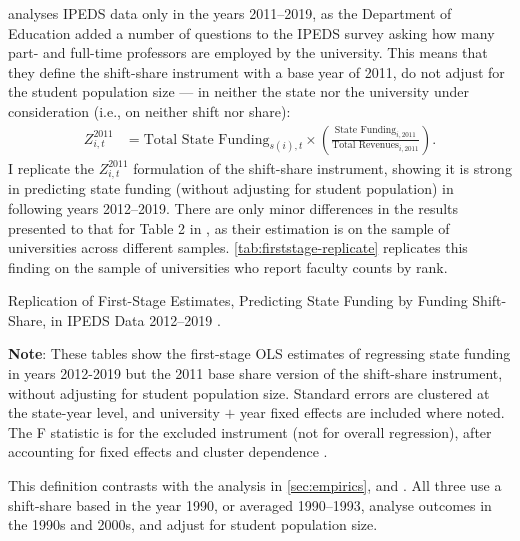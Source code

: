 \cite{hinrichs2022state} analyses IPEDS data only in the years 2011--2019, as the Department of Education added a number of questions to the IPEDS survey asking how many part- and full-time professors are employed by the university.
This means that they define the shift-share instrument with a base year of 2011, do not adjust for the student population size --- in neither the state nor the university under consideration (i.e., on neither shift nor share):
\begin{align}
    \label{eqn:replication-instrument}
    Z^{2011}_{i,t} &=
    \text{Total State Funding}_{s(i),t} \times
    \left( \frac{\text{State Funding}_{i,2011}}{\text{Total Revenues}_{i,2011}} \right).
\end{align}
I replicate the $Z^{2011}_{i,t}$ formulation of the shift-share instrument, showing it is strong in predicting state funding (without adjusting for student population) in following years 2012--2019.
There are only minor differences in the results presented to that for Table 2 in \cite{hinrichs2022state}, as their estimation is on the sample of universities across different samples.
\autoref{tab:firststage-replicate} replicates this finding on the sample of universities who report faculty counts by rank.
\begin{table}[H]
    \singlespacing
    \centering
    \caption{Replication of First-Stage Estimates, Predicting State Funding by Funding Shift-Share, in IPEDS Data 2012--2019 \citep{hinrichs2022state}.}
    \makebox[\textwidth][c]{}
    \label{tab:firststage-replicate}
    \justify
    \footnotesize
    \textbf{Note}:
    These tables show the first-stage OLS estimates of regressing state funding in years 2012-2019 but the 2011 base share version of the shift-share instrument, without adjusting for student population size.
    Standard errors are clustered at the state-year level, and university $+$ year fixed effects are included where noted.
    The F statistic is for the excluded instrument (not for overall regression), after accounting for fixed effects and cluster dependence \citep{olea2013robust}.
\end{table}
This definition contrasts with the analysis in \autoref{sec:empirics}, and \cite{NBERw23736,NBERw27885}.
All three use a shift-share based in the year 1990, or averaged 1990--1993, analyse outcomes in the 1990s and 2000s, and adjust for student population size.

